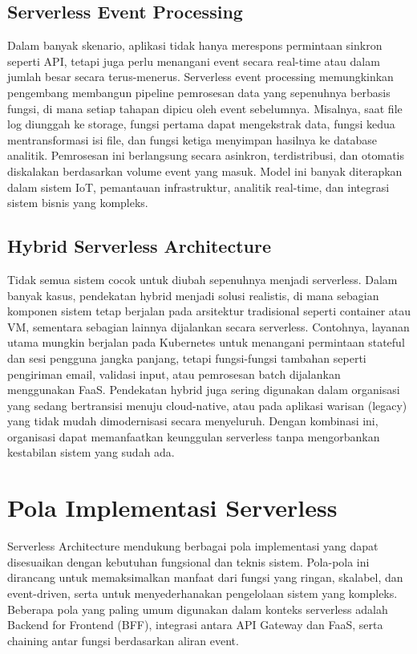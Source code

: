 \subsection{Serverless Event Processing}

Dalam banyak skenario, aplikasi tidak hanya merespons permintaan sinkron seperti API, tetapi juga perlu menangani event secara real-time atau dalam jumlah besar secara terus-menerus. Serverless event processing memungkinkan pengembang membangun pipeline pemrosesan data yang sepenuhnya berbasis fungsi, di mana setiap tahapan dipicu oleh event sebelumnya. Misalnya, saat file log diunggah ke storage, fungsi pertama dapat mengekstrak data, fungsi kedua mentransformasi isi file, dan fungsi ketiga menyimpan hasilnya ke database analitik. Pemrosesan ini berlangsung secara asinkron, terdistribusi, dan otomatis diskalakan berdasarkan volume event yang masuk. Model ini banyak diterapkan dalam sistem IoT, pemantauan infrastruktur, analitik real-time, dan integrasi sistem bisnis yang kompleks.

\subsection{Hybrid Serverless Architecture}

Tidak semua sistem cocok untuk diubah sepenuhnya menjadi serverless. Dalam banyak kasus, pendekatan hybrid menjadi solusi realistis, di mana sebagian komponen sistem tetap berjalan pada arsitektur tradisional seperti container atau VM, sementara sebagian lainnya dijalankan secara serverless. Contohnya, layanan utama mungkin berjalan pada Kubernetes untuk menangani permintaan stateful dan sesi pengguna jangka panjang, tetapi fungsi-fungsi tambahan seperti pengiriman email, validasi input, atau pemrosesan batch dijalankan menggunakan FaaS. Pendekatan hybrid juga sering digunakan dalam organisasi yang sedang bertransisi menuju cloud-native, atau pada aplikasi warisan (legacy) yang tidak mudah dimodernisasi secara menyeluruh. Dengan kombinasi ini, organisasi dapat memanfaatkan keunggulan serverless tanpa mengorbankan kestabilan sistem yang sudah ada.


\section{Pola Implementasi Serverless}

Serverless Architecture mendukung berbagai pola implementasi yang dapat disesuaikan dengan kebutuhan fungsional dan teknis sistem. Pola-pola ini dirancang untuk memaksimalkan manfaat dari fungsi yang ringan, skalabel, dan event-driven, serta untuk menyederhanakan pengelolaan sistem yang kompleks. Beberapa pola yang paling umum digunakan dalam konteks serverless adalah Backend for Frontend (BFF), integrasi antara API Gateway dan FaaS, serta chaining antar fungsi berdasarkan aliran event.

